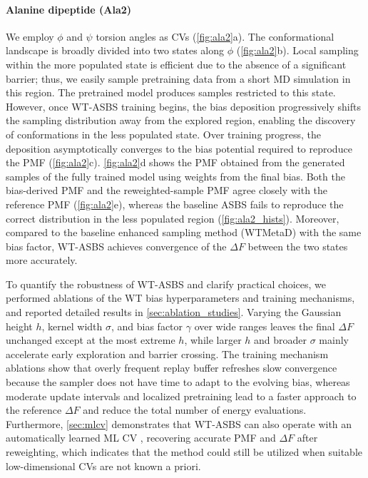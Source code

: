 \documentclass[]{fairmeta}
\theoremstyle{remark}
\begin{document}
\paragraph{Alanine dipeptide (Ala2)}
We employ $\phi$ and $\psi$ torsion angles as CVs (\cref{fig:ala2}a).
The conformational landscape is broadly divided into two states along $\phi$ (\cref{fig:ala2}b).
Local sampling within the more populated state is efficient due to the absence of a significant barrier; thus, we easily sample pretraining data from a short MD simulation in this region.
The pretrained model produces samples restricted to this state.
However, once WT-ASBS training begins, the bias deposition progressively shifts the sampling distribution away from the explored region, enabling the discovery of conformations in the less populated state.
Over training progress, the deposition asymptotically converges to the bias potential required to reproduce the PMF (\cref{fig:ala2}c).
\cref{fig:ala2}d shows the PMF obtained from the generated samples of the fully trained model using weights from the final bias.
Both the bias-derived PMF and the reweighted-sample PMF agree closely with the reference PMF (\cref{fig:ala2}e), whereas the baseline ASBS fails to reproduce the correct distribution in the less populated region (\cref{fig:ala2_hists}).
Moreover, compared to the baseline enhanced sampling method (WTMetaD) with the same bias factor, WT-ASBS achieves convergence of the $\Delta F$ between the two states more accurately.

To quantify the robustness of WT-ASBS and clarify practical choices, we performed ablations of the WT bias hyperparameters and training mechanisms, and reported detailed results in \cref{sec:ablation_studies}.
Varying the Gaussian height $h$, kernel width $\sigma$, and bias factor $\gamma$ over wide ranges leaves the final $\Delta F$ unchanged except at the most extreme $h$, while larger $h$ and broader $\sigma$ mainly accelerate early exploration and barrier crossing.
The training mechanism ablations show that overly frequent replay buffer refreshes slow convergence because the sampler does not have time to adapt to the evolving bias, whereas moderate update intervals and localized pretraining lead to a faster approach to the reference $\Delta F$ and reduce the total number of energy evaluations.
Furthermore, \cref{sec:mlcv} demonstrates that WT-ASBS can also operate with an automatically learned ML CV \citep{trizio2021enhanced}, recovering accurate PMF and $\Delta F$ after reweighting, which indicates that the method could still be utilized when suitable low-dimensional CVs are not known a priori.
\end{document}
